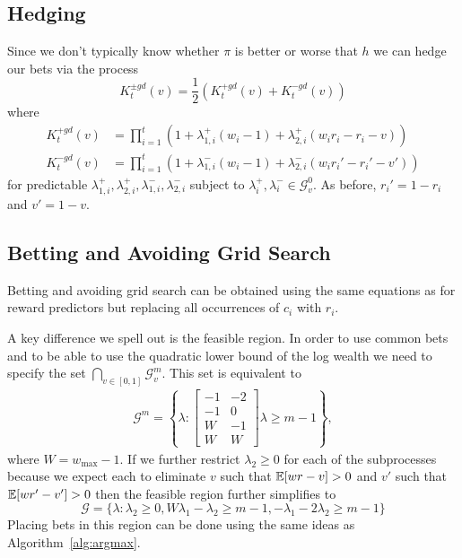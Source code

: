 \subsection{Hedging}
Since we don't typically know whether $\pi$ is better or 
worse that $h$ we can hedge our bets via the process
\[
K_{t}^{\pm gd}(v) =\frac{1}{2} (K_{t}^{+gd}(v)+K_{t}^{-gd}(v))
\]
where 
\begin{align*}
    K_{t}^{+ gd}(v) &=\prod_{i=1}^t \left(1+\lambda_{1,i}^{+} (w_i-1) + \lambda_{2,i}^{+} (w_ir_i -r_i -v)\right)  \\
    K_{t}^{- gd}(v) &=\prod_{i=1}^t \left(1+\lambda_{1,i}^{-} (w_i-1) + \lambda_{2,i}^{-} (w_ir_i' -r_i' -v')\right) 
\end{align*}
for predictable 
$\lambda_{1,i}^{+},\lambda_{2,i}^{+}, \lambda_{1,i}^{-},\lambda_{2,i}^{-}$
subject to $\lambda_i^{+},\lambda_{i}^{-} \in \mathcal{G}_{v}^0$.
As before, $r_i'=1-r_i$ and $v'=1-v$. 

\subsection{Betting and Avoiding Grid Search}
Betting and avoiding grid search can be obtained using 
the same equations as for reward predictors but replacing 
all occurrences of $c_i$ with $r_i$.

A key difference we spell out is the feasible region. In
order to use common bets and to be able to use the 
quadratic lower bound of the log wealth we need to 
specify the set $\bigcap_{v\in [0,1]} \mathcal{G}_v^{m}$.
This set is equivalent to
\begin{align*}
\mathcal{G}^m = \left\{\lambda:  
\left[\begin{array}{cc}
-1 & -2 \\ 
-1 & 0 \\
W &  -1\\
W & W
\end{array}\right]
\lambda \geq m - 1 \label{eq:gd-explicit-domain}
\right\},
\end{align*}
where $W = w_{\max}-1$. If we further restrict $\lambda_2 \geq 0$
for each of the subprocesses because we expect each to eliminate 
$v$ such that $\mathbb{E}[wr-v]>0$ and $v'$ such that $\mathbb{E}[wr'-v']>0$ 
then the feasible region further simplifies to 
\[
\mathcal{G} = \{\lambda: \lambda_2\geq 0,
W\lambda_1 -\lambda_2 \geq m-1, 
-\lambda_1 -2 \lambda_2 \geq m-1 \}
\]
Placing bets in this region can be done using the same 
ideas as Algorithm~\ref{alg:argmax}.

